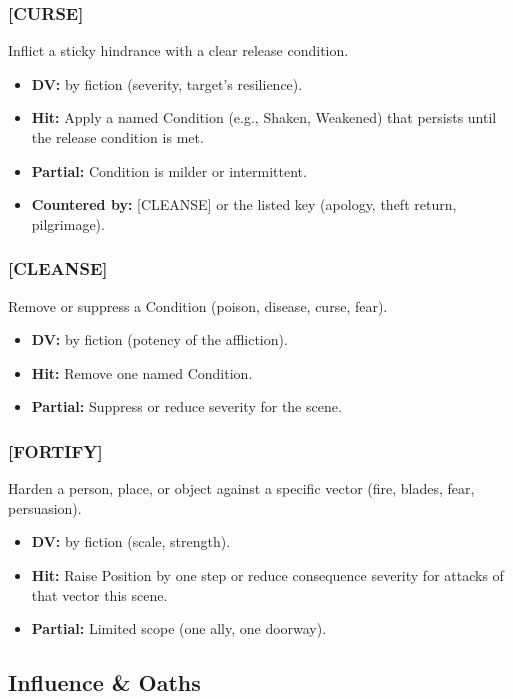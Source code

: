 \subsubsection{[CURSE]}
Inflict a sticky hindrance with a clear release condition.
\begin{itemize}
  \item \textbf{DV:} by fiction (severity, target's resilience).
  \item \textbf{Hit:} Apply a named Condition (e.g., Shaken, Weakened) that persists until the release condition is met.
  \item \textbf{Partial:} Condition is milder or intermittent.
  \item \textbf{Countered by:} [CLEANSE] or the listed key (apology, theft return, pilgrimage).
\end{itemize}

\subsubsection{[CLEANSE]}
Remove or suppress a Condition (poison, disease, curse, fear).
\begin{itemize}
  \item \textbf{DV:} by fiction (potency of the affliction).
  \item \textbf{Hit:} Remove one named Condition.
  \item \textbf{Partial:} Suppress or reduce severity for the scene.
\end{itemize}

\subsubsection{[FORTIFY]}
Harden a person, place, or object against a specific vector (fire, blades, fear, persuasion).
\begin{itemize}
  \item \textbf{DV:} by fiction (scale, strength).
  \item \textbf{Hit:} Raise Position by one step or reduce consequence severity for attacks of that vector this scene.
  \item \textbf{Partial:} Limited scope (one ally, one doorway).
\end{itemize}

\subsection{Influence \& Oaths}


